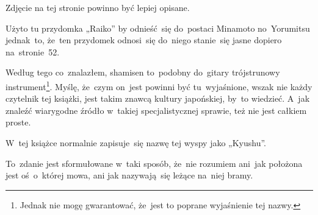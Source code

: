 \documentclass[a4paper,11pt]{article}
\begin{document}
\vspace{\spaceTwo}




\vspace{0em}



\vspace{0em}


\start {} Zdjęcie na tej stronie powinno być lepiej opisane.

\vspace{\spaceFour}



\start {} Użyto tu przydomka „Raiko” %
by odnieść~się do~postaci Minamoto no~Yorumitsu jednak~to, że~ten
przydomek odnosi~się do~niego stanie~się jasne dopiero na~stronie~52.

\vspace{\spaceFour}



\start {} Według tego co~znalazłem, shamisen
to~podobny do~gitary trójstrunowy instrument\footnote{Jednak nie mogę
  gwarantować, że~jest to poprane wyjaśnienie tej nazwy.}. Myślę,
że~czym on~jest powinni być tu~wyjaśnione, wszak nie każdy czytelnik
tej książki, jest takim znawcą kultury japońskiej, by~to wiedzieć.
A~jak znaleźć wiarygodne źródło w~takiej specjalistycznej sprawie, też
nie jest całkiem proste.

\vspace{\spaceFour}



\start {} W~tej książce normalnie zapisuje~się nazwę tej
wyspy jako „Kyushu”. %

\vspace{\spaceFour}



\start {} To~zdanie jest sformułowane w~taki sposób,
że~nie rozumiem ani~jak położona jest oś~o~której mowa, ani jak
nazywają~się leżące na~niej bramy.

\vspace{\spaceFour}
\end{document}
